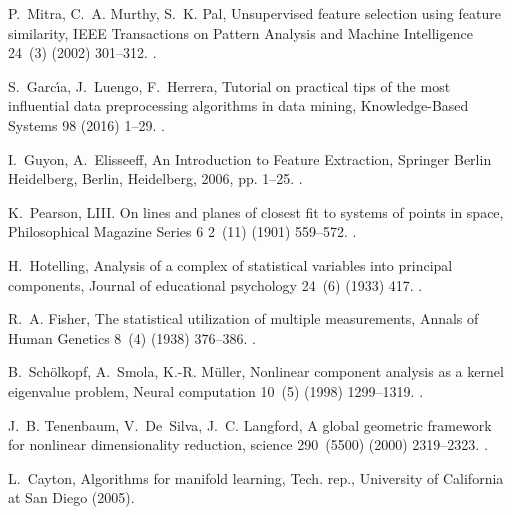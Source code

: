 \documentclass[preprint,5p,compress]{elsarticle}
\begin{document}
\begin{thebibliography}{100}
P.~Mitra, C.~A. Murthy, S.~K. Pal, Unsupervised feature selection using feature
  similarity, IEEE Transactions on Pattern Analysis and Machine Intelligence
  24~(3) (2002) 301--312.
\newblock \href {http://dx.doi.org/10.1109/34.990133}
  {}.

S.~Garc{\'\i}a, J.~Luengo, F.~Herrera, Tutorial on practical tips of the most
  influential data preprocessing algorithms in data mining, Knowledge-Based
  Systems 98 (2016) 1--29.
\newblock \href {http://dx.doi.org/10.1016/j.knosys.2015.12.006}
  {}.

I.~Guyon, A.~Elisseeff, An Introduction to Feature Extraction, Springer Berlin
  Heidelberg, Berlin, Heidelberg, 2006, pp. 1--25.
\newblock \href {http://dx.doi.org/10.1007/978-3-540-35488-8\_1}
  {}.

K.~Pearson, {LIII}. {On} lines and planes of closest fit to systems of points
  in space, Philosophical Magazine Series 6 2~(11) (1901) 559--572.
\newblock \href {http://dx.doi.org/10.1080/14786440109462720}
  {}.

H.~Hotelling, Analysis of a complex of statistical variables into principal
  components, Journal of educational psychology 24~(6) (1933) 417.
\newblock \href {http://dx.doi.org/10.1037/h0071325}
  {}.

R.~A. Fisher, The statistical utilization of multiple measurements, Annals of
  Human Genetics 8~(4) (1938) 376--386.
\newblock \href {http://dx.doi.org/10.1111/j.1469-1809.1938.tb02189.x}
  {}.

B.~Sch{\"o}lkopf, A.~Smola, K.-R. M{\"u}ller, Nonlinear component analysis as a
  kernel eigenvalue problem, Neural computation 10~(5) (1998) 1299--1319.
\newblock \href {http://dx.doi.org/10.1162/089976698300017467}
  {}.

J.~B. Tenenbaum, V.~De~Silva, J.~C. Langford, A global geometric framework for
  nonlinear dimensionality reduction, science 290~(5500) (2000) 2319--2323.
\newblock \href {http://dx.doi.org/10.1126/science.290.5500.2319}
  {}.

L.~Cayton, Algorithms for manifold learning, Tech. rep., University of
  California at San Diego (2005).


\end{thebibliography}
\end{document}
